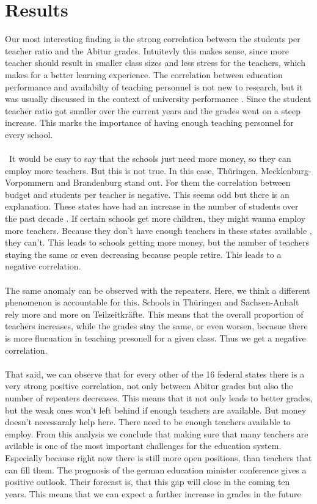 \section*{Results}
Our most interesting finding is the strong correlation between the students per teacher ratio and the Abitur grades. Intuitevly this makes sense, since more teacher should result in smaller class sizes and less stress for the teachers, which makes for a better learning experience. The correlation between education performance and availabilty of teaching personnel is not new to research, but it was usually discussed in the context of university performance \cite{doi:10.1080/00220485.1984.10845072}. Since the student teacher ratio got smaller over the current years and the grades went on a steep increase. This marks the importance of having enough teaching personnel for every school.\\\\\
It would be easy to say that the schools just need more money, so they can employ more teachers. But this is not true. In this case, Thüringen, Mecklenburg-Vorpommern and Brandenburg stand out. For them the correlation between budget and students per teacher is negative. This seems odd but there is an explanation. These states have had an increase in the number of students over the past decade \cite{Brandenburg}\cite{Sachsen} \cite{Mecklenburg}.  If certain schools get more children, they might wanna employ more teachers. Because they don't have enough teachers in these states available \cite{Kultusministerkonferenz}, they can't. This leads to schools getting more money, but the number of teachers staying the same or even decreasing because people retire. This leads to a negative correlation.\\\\
The same anomaly can be observed with the repeaters. Here, we think a different phenomenon is accountable for this. Schools in Thüringen and Sachsen-Anhalt rely more and more on Teilzeitkräfte. This means that the overall proportion of teachers increases, while the grades stay the same, or even worsen, becasue there is more flucuation in teaching presonell for a given class. Thus we get a negative correlation.\\\\
That said, we can observe that for every other of the 16 federal states there is a very strong positive correlation, not only between Abitur grades but also the number of repeaters decreases. This means that it not only leads to better grades, but the weak ones won't left behind if enough teachers are available. But money doesn't necessaraly help here. There need to be enough teachers available to employ. From this analysis we conclude that making sure that many teachers are avilable is one of the most important challenges for the education system. Especially because right now there is still more open positions, than teachers that can fill them. The prognosis of the german education minister conference \cite{Kultusministerkonferenz} gives a positive outlook. Their forecast is, that this gap will close in the coming ten years. This means that we can expect a further increase in grades in the future\\\\
